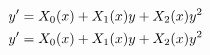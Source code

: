 \documentclass{book}
\begin{document}
\setcounter{chapter}{3}

\begin{gather}
y'=X_{0}(x)+X_{1}(x)y+X_{2}(x)y^{2}\\
y'=X_{0}(x)+X_{1}(x)y+X_{2}(x)y^{2}
\raisetag{3pt}
\end{gather}
\end{document}
